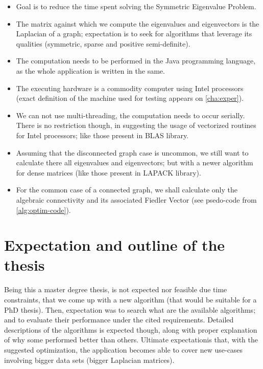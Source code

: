 \begin{itemize}
  \item Goal is to reduce the time spent solving the Symmetric Eigenvalue
    Problem. \\
  \item The matrix against which we compute the eigenvalues and
    eigenvectors is the Laplacian of a graph; expectation is to seek
    for algorithms that leverage its qualities (symmetric, sparse and
    positive semi-definite). \\
  \item The computation needs to be performed in the Java programming
    language, as the whole application is written in the same. \\
  \item The executing hardware is a commodity computer using Intel
    processors (exact definition of the machine used for testing
    appears on \cref{cha:exper}).
  \item We can not use multi-threading, the computation needs to occur
    serially. There is no restriction
    though, in suggesting the usage of vectorized routines for Intel
    processors; like those present in BLAS library. \\
  \item Assuming that the disconnected graph case is uncommon, we
    still want to calculate there all eigenvalues and eigenvectors;
    but with a newer algorithm for dense matrices (like those present
    in LAPACK library). \\
  \item For the common case of a connected graph, we shall calculate
    only the algebraic connectivity and its associated Fiedler
    Vector (see psedo-code from  \cref{alg:optim-code}).
\end{itemize}
\hfill

\section{Expectation and outline of the thesis}
Being this a master degree thesis, is not expected nor feasible due
time constraints, that we come up with a new algorithm (that would be
suitable for a PhD thesis). Then, expectation was to search what are
the available algorithms; and to evaluate their performance under the
cited requirements. Detailed descriptions of the algorithms is
expected though, along with proper explanation of why some performed
better than others. Ultimate expectationis that, with the suggested
optimization, the application becomes able to cover new use-cases
involving bigger data sets (bigger Laplacian matrices). \\

